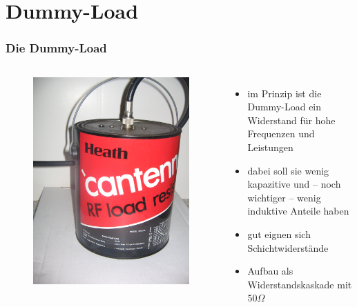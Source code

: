 \section*{Dummy-Load}

\begin{frame}
  \frametitle{Die Dummy-Load}
  \begin{columns}
    \begin{figure}
      \includegraphics[width=\textwidth,height=.7\textheight,keepaspectratio]{a17/Cantenna.jpg}
    \end{figure}
    \begin{itemize}
      \item im Prinzip ist die Dummy-Load ein Widerstand für hohe Frequenzen und Leistungen
      \item dabei soll sie wenig kapazitive und -- noch wichtiger -- wenig induktive Anteile haben
      \item gut eignen sich Schichtwiderstände
      \item Aufbau als Widerstandskaskade mit $50\Omega$
    \end{itemize}
  \end{columns}
\end{frame}

